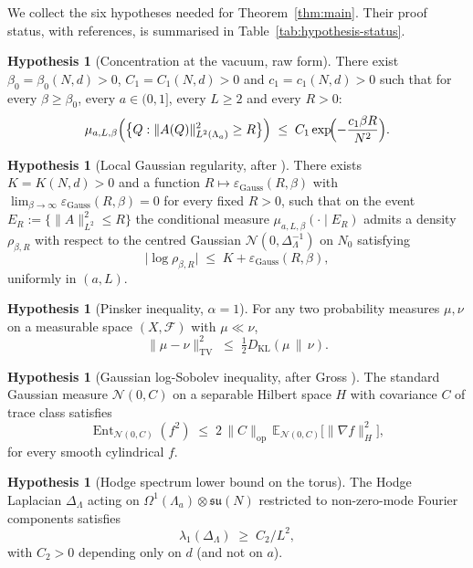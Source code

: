 \documentclass[11pt,reqno]{amsart}
\theoremstyle{plain}
\theoremstyle{definition}
\newtheorem{hypothesis}[theorem]{Hypothesis}
\theoremstyle{remark}
\newcommand{\KL}{D_{\mathrm{KL}}}
\newcommand{\TV}{\mathrm{TV}}
\newcommand{\Lat}{\Lambda}
\newcommand{\sun}{\mathfrak{su}(N)}
\begin{document}
We collect the six hypotheses needed for Theorem~\ref{thm:main}. Their proof status, with references, is summarised in Table~\ref{tab:hypothesis-status}.

\begin{hypothesis}[Concentration at the vacuum, raw form]
\label{hyp:H1}
There exist $\beta_0 = \beta_0(N, d) > 0$, $C_1 = C_1(N, d) > 0$ and $c_1 = c_1(N, d) > 0$ such that for every $\beta \ge \beta_0$, every $a \in (0, 1]$, every $L \ge 2$ and every $R > 0$:
\[
  \mu_{a, L, \beta}\Bigl( \bigl\{ Q : \|A(Q)\|_{L^2(\Lat_a)}^2 \ge R \bigr\} \Bigr) \;\le\; C_1 \exp\!\Bigl( - \frac{c_1 \beta R}{N^2} \Bigr).
\]
\end{hypothesis}

\begin{hypothesis}[Local Gaussian regularity, after \cite{MRS93}]
\label{hyp:H2}
There exists $K = K(N, d) > 0$ and a function $R \mapsto \varepsilon_{\mathrm{Gauss}}(R, \beta)$ with $\lim_{\beta \to \infty} \varepsilon_{\mathrm{Gauss}}(R, \beta) = 0$ for every fixed $R > 0$, such that on the event $E_R := \{\|A\|_{L^2}^2 \le R\}$ the conditional measure $\mu_{a,L,\beta}(\cdot \mid E_R)$ admits a density $\rho_{\beta, R}$ with respect to the centred Gaussian $\mathcal{N}(0, \Delta_\Lat^{-1})$ on $N_0$ satisfying
\[
  \bigl| \log \rho_{\beta, R} \bigr| \;\le\; K + \varepsilon_{\mathrm{Gauss}}(R, \beta),
\]
uniformly in $(a, L)$.
\end{hypothesis}

\begin{hypothesis}[Pinsker inequality, $\alpha = 1$]
\label{hyp:H3}
For any two probability measures $\mu, \nu$ on a measurable space $(X, \mathcal{F})$ with $\mu \ll \nu$,
\[
  \|\mu - \nu\|_{\TV}^2 \;\le\; \tfrac{1}{2} \KL(\mu \,\|\, \nu).
\]
\end{hypothesis}

\begin{hypothesis}[Gaussian log-Sobolev inequality, after Gross \cite{Gross1975}]
\label{hyp:H4}
The standard Gaussian measure $\mathcal{N}(0, C)$ on a separable Hilbert space $H$ with covariance $C$ of trace class satisfies
\[
  \operatorname{Ent}_{\mathcal{N}(0, C)}(f^2) \;\le\; 2 \, \|C\|_{\mathrm{op}} \, \mathbb{E}_{\mathcal{N}(0,C)}\bigl[ \|\nabla f\|_H^2 \bigr],
\]
for every smooth cylindrical $f$.
\end{hypothesis}

\begin{hypothesis}[Hodge spectrum lower bound on the torus]
\label{hyp:H5}
The Hodge Laplacian $\Delta_\Lat$ acting on $\Omega^1(\Lat_a) \otimes \sun$ restricted to non-zero-mode Fourier components satisfies
\[
  \lambda_1(\Delta_\Lat) \;\ge\; C_2 / L^2,
\]
with $C_2 > 0$ depending only on $d$ (and not on $a$).
\end{hypothesis}
\end{document}
